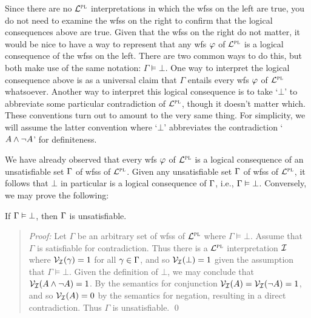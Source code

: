 \begin{earg}
\end{earg}

Since there are no $\mathcal{L}^{\textsc{pl}}$ interpretations in which the wfss on the left are true, you do not need to examine the wfss on the right to confirm that the logical consequences above are true.
Given that the wfss on the right do not matter, it would be nice to have a way to represent that any wfs $\varphi$ of $\mathcal{L}^{\textsc{pl}}$ is a logical consequence of the wfss on the left.
There are two common ways to do this, but both make use of the same notation: $\Gamma \vDash \bot$.
One way to interpret the logical consequence above is as a universal claim that $\Gamma$ entails every wfs $\varphi$ of $\mathcal{L}^{\textsc{pl}}$ whatsoever. 
Another way to interpret this logical consequence is to take `$\bot$' to abbreviate some particular contradiction of $\mathcal{L}^{\textsc{pl}}$, though it doesn't matter which.
These conventions turn out to amount to the very same thing.
For simplicity, we will assume the latter convention where `$\bot$' abbreviates the contradiction `$A \wedge \neg A$' for definiteness.

We have already observed that every wfs $\varphi$ of $\mathcal{L}^{\textsc{pl}}$ is a logical consequence of an unsatisfiable set $\Gamma$ of wfss of $\mathcal{L}^{\textsc{pl}}$.
Given any unsatisfiable set $\Gamma$ of wfss of $\mathcal{L}^{\textsc{pl}}$, it follows that $\bot$ in particular is a logical consequence of $\Gamma$, i.e., $\Gamma \vDash \bot$. 
Conversely, we may prove the following: 

\begin{Lthm} \label{lemma:unsat_bot}
  If $\Gamma \vDash \bot$, then $\Gamma$ is unsatisfiable. 
\end{Lthm} \vspace{-.2in}

\begin{quote} 
  \textit{Proof:}
  Let $\Gamma$ be an arbitrary set of wfss of $\mathcal{L}^{\textsc{pl}}$ where $\Gamma \vDash \bot$.
  Assume that $\Gamma$ is satisfiable for contradiction.
  Thus there is a $\mathcal{L}^{\textsc{pl}}$ interpretation $\mathcal{I}$ where $\mathcal{V}_{\mathcal{I}}(\gamma) = 1$ for all $\gamma \in \Gamma$, and so $\mathcal{V}_{\mathcal{I}}(\bot) = 1$ given the assumption that $\Gamma \vDash \bot$.
  Given the definition of $\bot$, we may conclude that $\mathcal{V}_{\mathcal{I}}(A \wedge \neg A) = 1$.
  By the semantics for conjunction $\mathcal{V}_{\mathcal{I}}(A) = \mathcal{V}_{\mathcal{I}}(\neg A) = 1$, and so $\mathcal{V}_{\mathcal{I}}(A) = 0$ by the semantics for negation, resulting in a direct contradiction.
  Thus $\Gamma$ is unsatisfiable. 
  \qed
\end{quote}

